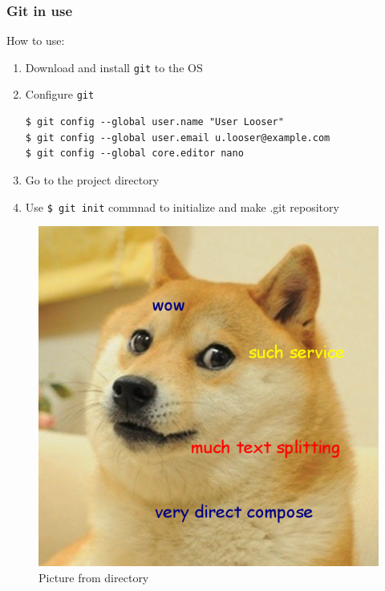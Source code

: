 \documentclass[12pt]{article}
\begin{document}
\subsubsection{Git in use}
\par How to use:
\begin{enumerate}
\item Download and install \texttt{git} to the OS
\item Configure \texttt{git}
\begin{verbatim}
$ git config --global user.name "User Looser"
$ git config --global user.email u.looser@example.com
$ git config --global core.editor nano
\end{verbatim}
\item Go to the project directory
\item Use \texttt{\$ git init} commnad to initialize and make .git repository
\end{enumerate}


\begin{figure}[!h]
\centering
\includegraphics[scale=0.50]{doge.png}
\caption{Picture from directory}
\label{dogepic}
\end{figure}
\end{document}

